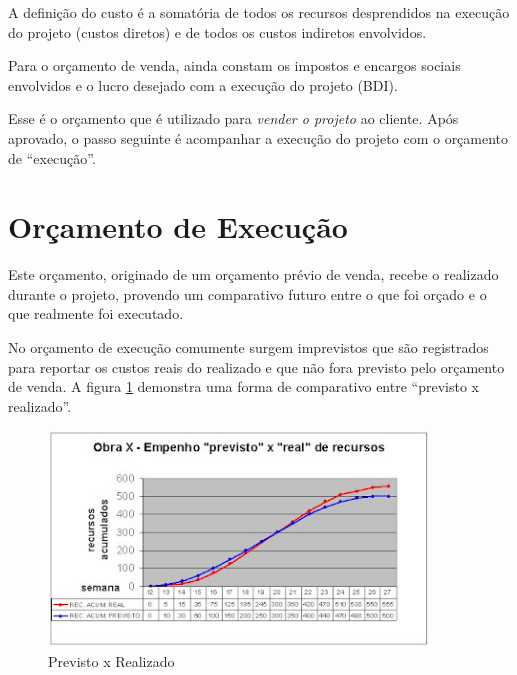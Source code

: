 A definição do custo é a somatória de todos os recursos desprendidos na execução do projeto (custos diretos) e de todos os custos indiretos envolvidos.

Para o orçamento de venda, ainda constam os impostos e encargos sociais envolvidos e o lucro desejado com a execução do projeto (BDI).

Esse é o orçamento que é utilizado para \emph{vender o projeto} ao cliente. Após aprovado, o passo seguinte é acompanhar a execução do projeto com o orçamento de ``execução''.

\section{Orçamento de Execução}

Este orçamento, originado de um orçamento prévio de venda, recebe o realizado durante o projeto, provendo um comparativo futuro entre o que foi orçado e o que realmente foi executado. 

No orçamento de execução comumente surgem imprevistos que são registrados para reportar os custos reais do realizado e que não fora previsto pelo orçamento de venda. A figura \ref{fig:curva_abc} demonstra uma forma de comparativo entre ``previsto x realizado''.


\begin{figure}[htb]
	\centering
	\includegraphics[width=0.9\textwidth]{figuras/curva_abc.jpg}
	\caption[Curva ABC]{Previsto x Realizado}
	\label{fig:curva_abc}
\end{figure}